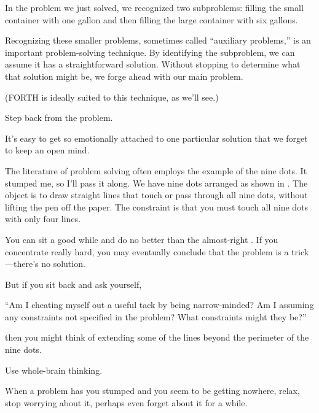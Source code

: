 In the problem we just solved, we recognized two subproblems: filling
the small container with one gallon and then filling the large container
with six gallons.

Recognizing these smaller problems, sometimes called ``auxiliary
problems,'' is an important problem-solving technique. By identifying
the subproblem, we can assume it has a straightforward solution.
Without stopping to determine what that solution might be, we forge
ahead with our main problem.

(FORTH is ideally suited to this technique, as we'll see.)
\begin{tip}
Step back from the problem.
\end{tip}
It's easy to get so emotionally attached to one particular solution that we
forget to keep an open mind.

The literature of problem solving often employs the example of the
nine dots. It stumped me, so I'll pass it along. We have nine dots arranged
as shown in . The object is to draw straight lines that
touch or pass through all nine dots, without lifting the pen off the paper.
The constraint is that you must touch all nine dots with only four lines.



You can sit a good while and do no better than the almost-right
. If you concentrate really hard, you may eventually conclude
that the problem is a trick---there's no solution.



But if you sit back and ask yourself,
\begin{tfquot}
``Am I cheating myself out a useful tack by being narrow-minded? Am I
assuming any constraints not specified in the problem? What constraints
might they be?''
\end{tfquot}
then you might think of extending some of the lines beyond the perimeter
of the nine dots.
\begin{tip}
Use whole-brain thinking.
\end{tip}
When a problem has you stumped and you seem to be getting nowhere,
relax, stop worrying about it, perhaps even forget about it for a while.

